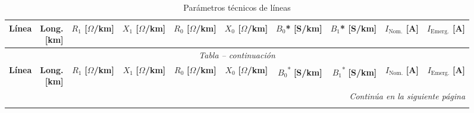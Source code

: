 \begin{center}
\small
\setlength{\tabcolsep}{2pt}
\renewcommand{\arraystretch}{1.15}

\begin{longtable}{|p{5.8cm}|r|r|r|r|r|r|r|r|r|}
\caption{Parámetros técnicos de líneas}
\label{tab:parametros_lineas} \\

\hline
\textbf{Línea} &
\makecell{\textbf{Long.}\\\textbf{[km]}} &
\makecell{\textbf{$R_1$}\\\textbf{[$\Omega$/km]}} &
\makecell{\textbf{$X_1$}\\\textbf{[$\Omega$/km]}} &
\makecell{\textbf{$R_0$}\\\textbf{[$\Omega$/km]}} &
\makecell{\textbf{$X_0$}\\\textbf{[$\Omega$/km]}} &
\makecell{\textbf{$B_0$*}\\\textbf{[S/km]}} &
\makecell{\textbf{$B_1$*}\\\textbf{[S/km]}} &
\makecell{\textbf{$I_{\mathrm{Nom.}}$}\\\textbf{[A]}} &
\makecell{\textbf{$I_{\mathrm{Emerg.}}$}\\\textbf{[A]}} \\
\hline
\endfirsthead

\hline
\multicolumn{10}{|c|}{\textit{Tabla \thetable{} -- continuación}} \\
\hline

\textbf{Línea} &
\makecell{\textbf{Long.}\\\textbf{[km]}} &
\makecell{\textbf{$R_1$}\\\textbf{[$\Omega$/km]}} &
\makecell{\textbf{$X_1$}\\\textbf{[$\Omega$/km]}} &
\makecell{\textbf{$R_0$}\\\textbf{[$\Omega$/km]}} &
\makecell{\textbf{$X_0$}\\\textbf{[$\Omega$/km]}} &
\makecell{\textbf{$B_0$}\textsuperscript{*}\\\textbf{[S/km]}} &
\makecell{\textbf{$B_1$}\textsuperscript{*}\\\textbf{[S/km]}} &
\makecell{\textbf{$I_{\mathrm{Nom.}}$}\\\textbf{[A]}} &
\makecell{\textbf{$I_{\mathrm{Emerg.}}$}\\\textbf{[A]}} \\
\hline
\endhead

\hline
\multicolumn{10}{|r|}{\textit{Continúa en la siguiente página}} \\
\hline
\endfoot


\end{longtable}
\end{center}
